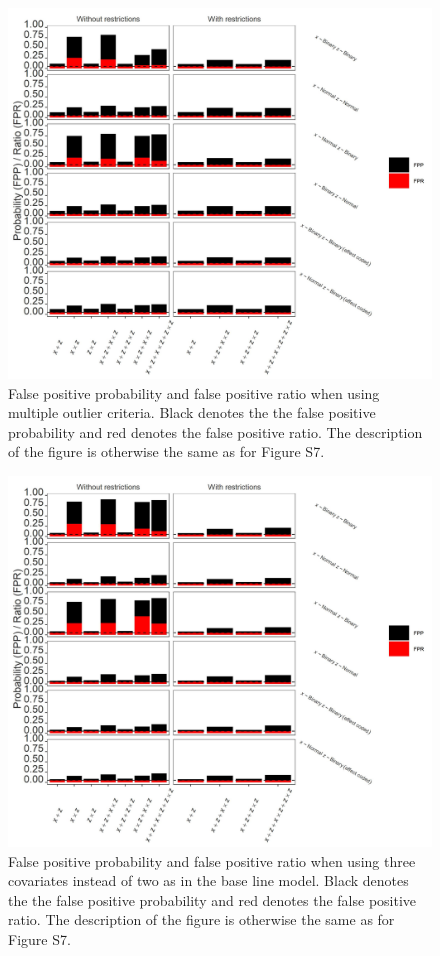 \begin{figure}[hbt!]
\includegraphics[scale=0.95]{R/Analysis/Result/Figures/Figure1BSIBon.jpeg}
\centering
\caption{False positive probability and false positive ratio when using multiple outlier criteria. Black denotes the the false positive probability and red denotes the false positive ratio. The description of the figure is otherwise the same as for Figure S7.
}
\label{fig:mainfigure}
\end{figure}

\begin{figure}[hbt!]
\includegraphics[scale=0.95]{R/Analysis/Result/Figures/Figure1CSIBon.jpeg}
\centering
\caption{False positive probability and false positive ratio when using three covariates instead of two as in the base line model. Black denotes the the false positive probability and red denotes the false positive ratio. The description of the figure is otherwise the same as for Figure S7.
}
\label{fig:mainfigure}
\end{figure}

